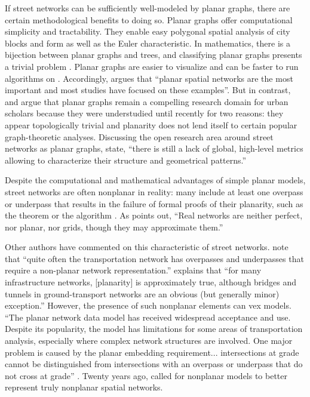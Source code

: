 \documentclass[Afour,sageh,times]{sagej}
\begin{document}
If street networks can be sufficiently well-modeled by planar graphs, there are certain methodological benefits to doing so. Planar graphs offer computational simplicity and tractability. They enable easy polygonal spatial analysis of city blocks and form \citep{fohl_non-planar_1996,barthelemy_paths_2017} as well as the Euler characteristic. In mathematics, there is a bijection between planar graphs and trees, and classifying planar graphs presents a trivial problem \citep{louf_typology_2014}. Planar graphs are easier to visualize and can be faster to run algorithms on \citep{liebers_planarizing_2001}. Accordingly, \citet[p.~3]{barthelemy_spatial_2011} argues that \enquote{planar spatial networks are the most important and most studies have focused on these examples}. But in contrast, \citet{masucci_random_2009} and \citet{masucci_limited_2013} argue that planar graphs remain a compelling research domain for urban scholars because they were understudied until recently for two reasons: they appear topologically trivial and planarity does not lend itself to certain popular graph-theoretic analyses. Discussing the open research area around street networks as planar graphs, \citet[p.~1]{viana_simplicity_2013} state, \enquote{there is still a lack of global, high-level metrics allowing to characterize their structure and geometrical patterns.}

Despite the computational and mathematical advantages of simple planar models, street networks are often nonplanar in reality: many include at least one overpass or underpass that results in the failure of formal proofs of their planarity, such as the \citet{kuratowski_sur_1930} theorem or the \cite{hopcroft_efficient_1974} algorithm \citep[cf.][]{gastner_spatial_2006}. As \citet[p.~7]{levinson_network_2012} points out, \enquote{Real networks are neither perfect, nor planar, nor grids, though they may approximate them.}

Other authors have commented on this characteristic of street networks. \citet[p.~199]{jiang_object-oriented_2010} note that \enquote{quite often the transportation network has overpasses and underpasses that require a non-planar network representation.} \citet[p.~1258]{fischer_spatial_2014} explains that \enquote{for many infrastructure networks, {[planarity]} is approximately true, although bridges and tunnels in ground-transport networks are an obvious (but generally minor) exception.} However, the presence of such nonplanar elements can vex models. \enquote{The planar network data model has received widespread acceptance and use. Despite its popularity, the model has limitations for some areas of transportation analysis, especially where complex network structures are involved. One major problem is caused by the planar embedding requirement... intersections at grade cannot be distinguished from intersections with an overpass or underpass that do not cross at grade} \citep[p.~395]{fischer_gis_2004}. Twenty years ago, \citet[p.~18]{fohl_non-planar_1996} called for nonplanar models to better represent truly nonplanar spatial networks.
\end{document}

